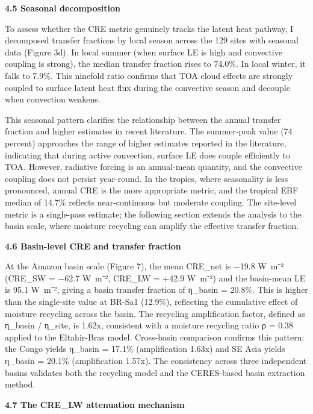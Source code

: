 \textbf{4.5 Seasonal decomposition}

To assess whether the CRE metric genuinely tracks the latent heat
pathway, I decomposed transfer fractions by local season across the 129
sites with seasonal data (Figure 3d). In local summer (when surface LE
is high and convective coupling is strong), the median transfer fraction
rises to 74.0\%. In local winter, it falls to 7.9\%. This ninefold ratio
confirms that TOA cloud effects are strongly coupled to surface latent
heat flux during the convective season and decouple when convection
weakens.

This seasonal pattern clarifies the relationship between the annual
transfer fraction and higher estimates in recent literature. The
summer-peak value (74 percent) approaches the range of higher estimates reported in the literature, indicating
that during active convection, surface LE does couple efficiently to
TOA. However, radiative forcing is an annual-mean quantity, and the
convective coupling does not persist year-round. In the tropics, where
seasonality is less pronounced, annual CRE is the more appropriate
metric, and the tropical EBF median of 14.7\% reflects near-continuous
but moderate coupling. The site-level metric is a single-pass estimate;
the following section extends the analysis to the basin scale, where
moisture recycling can amplify the effective transfer fraction.

\textbf{4.6 Basin-level CRE and transfer fraction}

At the Amazon basin scale (Figure 7), the mean CRE\_net is −19.8 W~m⁻²
(CRE\_SW = −62.7 W~m⁻², CRE\_LW = +42.9 W~m⁻²) and the basin-mean LE is
95.1 W~m⁻², giving a basin transfer fraction of η\_basin = 20.8\%. This
is higher than the single-site value at BR-Sa1 (12.9\%), reflecting the
cumulative effect of moisture recycling across the basin. The recycling
amplification factor, defined as η\_basin / η\_site, is 1.62x,
consistent with a moisture recycling ratio ρ = 0.38 applied to the
Eltahir-Bras model. Cross-basin comparison confirms this pattern: the
Congo yields η\_basin = 17.1\% (amplification 1.63x) and SE Asia
yields η\_basin = 20.1\% (amplification 1.57x). The consistency across
three independent basins validates both the recycling model and the
CERES-based basin extraction method.

\textbf{4.7 The CRE\_LW attenuation mechanism}

